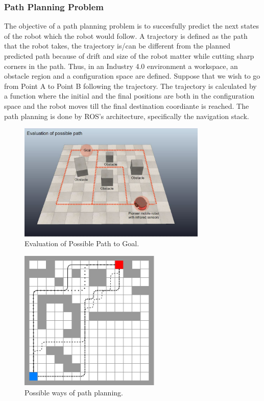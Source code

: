 \subsubsection{Path Planning Problem}
The objective of a path planning problem is to succesfully predict the next states of the robot which the robot would follow. A trajectory is defined as the path that the robot takes, the trajectory is/can be different from the planned predicted path because of drift and size of the robot matter while cutting sharp corners in the path.
Thus, in an Industry 4.0 environment a workspace, an obstacle region and a configuration space are defined. Suppose that we wish to go from Point A to Point B following the trajectory. The trajectory is calculated by a function where the initial and the final positions are both in the configuration space and the robot moves till the final destination coordiante is reached.
The path planning is done by ROS's architecture, specifically the navigation stack.

\begin{figure}[th]
\centering
\includegraphics[width=0.8\textwidth]{Figures/path-planning-to-goal.jpg}
\decoRule
\caption[]{Evaluation of Possible Path to Goal.}
\label{fig:Path Planning}
\end{figure}

\begin{figure}[th]
    \centering
    \includegraphics[width=0.6\textwidth]{Figures/14x14_grid_paths.png}
    \decoRule
    \caption{Possible ways of path planning.}
    \label{fig: Grid Paths}
\end{figure}

